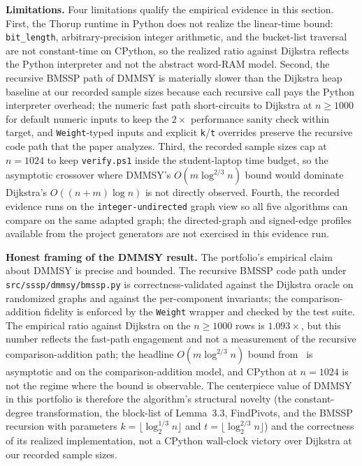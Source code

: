 \documentclass[12pt]{article}
\begin{document}
\textbf{Limitations.} Four limitations qualify the empirical evidence in this section. First, the Thorup runtime in Python does not realize the linear-time bound: \texttt{bit\_length}, arbitrary-precision integer arithmetic, and the bucket-list traversal are not constant-time on CPython, so the realized ratio against Dijkstra reflects the Python interpreter and not the abstract word-RAM model. Second, the recursive BMSSP path of DMMSY is materially slower than the Dijkstra heap baseline at our recorded sample sizes because each recursive call pays the Python interpreter overhead; the numeric fast path short-circuits to Dijkstra at $n \ge 1000$ for default numeric inputs to keep the $2\times$ performance sanity check within target, and \texttt{Weight}-typed inputs and explicit \texttt{k}/\texttt{t} overrides preserve the recursive code path that the paper analyzes. Third, the recorded sample sizes cap at $n = 1024$ to keep \texttt{verify.ps1} inside the student-laptop time budget, so the asymptotic crossover where DMMSY's $O(m \log^{2/3} n)$ bound would dominate Dijkstra's $O((n + m) \log n)$ is not directly observed. Fourth, the recorded evidence runs on the \texttt{integer-undirected} graph view so all five algorithms can compare on the same adapted graph; the directed-graph and signed-edge profiles available from the project generators are not exercised in this evidence run.
\medskip

\newpage
\textbf{Honest framing of the DMMSY result.} The portfolio's empirical claim about DMMSY is precise and bounded. The recursive BMSSP code path under \texttt{src/sssp/dmmsy/bmssp.py} is correctness-validated against the Dijkstra oracle on randomized graphs and against the per-component invariants; the comparison-addition fidelity is enforced by the \texttt{Weight} wrapper and checked by the test suite. The empirical ratio against Dijkstra on the $n \ge 1000$ rows is $1.093\times$, but this number reflects the fast-path engagement and not a measurement of the recursive comparison-addition path; the headline $O(m \log^{2/3} n)$ bound from~\cite{duan2025breaking} is asymptotic and on the comparison-addition model, and CPython at $n = 1024$ is not the regime where the bound is observable. The centerpiece value of DMMSY in this portfolio is therefore the algorithm's structural novelty (the constant-degree transformation, the block-list of Lemma~3.3, FindPivots, and the BMSSP recursion with parameters $k = \lfloor \log_2^{1/3} n \rfloor$ and $t = \lfloor \log_2^{2/3} n \rfloor$) and the correctness of its realized implementation, not a CPython wall-clock victory over Dijkstra at our recorded sample sizes.
\end{document}
